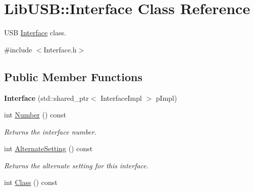 \hypertarget{class_lib_u_s_b_1_1_interface}{\section{Lib\-U\-S\-B\-:\-:Interface Class Reference}
\label{class_lib_u_s_b_1_1_interface}
}


U\-S\-B \hyperlink{class_lib_u_s_b_1_1_interface}{Interface} class.  




{\ttfamily \#include $<$Interface.\-h$>$}

\subsection*{Public Member Functions}
\begin{DoxyCompactItemize}
\item 
\hypertarget{class_lib_u_s_b_1_1_interface_a7f338d55d22c5f8916c7f60fdd53712c}{{\bfseries Interface} (std\-::shared\-\_\-ptr$<$ Interface\-Impl $>$ p\-Impl)}\label{class_lib_u_s_b_1_1_interface_a7f338d55d22c5f8916c7f60fdd53712c}

\item 
\hypertarget{class_lib_u_s_b_1_1_interface_a481db81fa12cf6324162be7bdf8a53bb}{int \hyperlink{class_lib_u_s_b_1_1_interface_a481db81fa12cf6324162be7bdf8a53bb}{Number} () const }\label{class_lib_u_s_b_1_1_interface_a481db81fa12cf6324162be7bdf8a53bb}

\begin{DoxyCompactList}\small\item\em Returns the interface number. \end{DoxyCompactList}\item 
\hypertarget{class_lib_u_s_b_1_1_interface_a52b602b375dc3e53b2c6c3bafb7be3d7}{int \hyperlink{class_lib_u_s_b_1_1_interface_a52b602b375dc3e53b2c6c3bafb7be3d7}{Alternate\-Setting} () const }\label{class_lib_u_s_b_1_1_interface_a52b602b375dc3e53b2c6c3bafb7be3d7}

\begin{DoxyCompactList}\small\item\em Returns the alternate setting for this interface. \end{DoxyCompactList}\item 
\hypertarget{class_lib_u_s_b_1_1_interface_a5e87fddb4aa5f1e859058ee9bd2a02f7}{int \hyperlink{class_lib_u_s_b_1_1_interface_a5e87fddb4aa5f1e859058ee9bd2a02f7}{Class} () const }\label{class_lib_u_s_b_1_1_interface_a5e87fddb4aa5f1e859058ee9bd2a02f7}


\end{DoxyCompactItemize}
